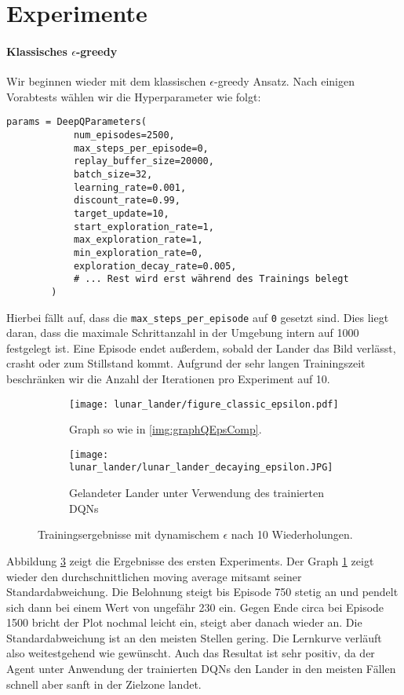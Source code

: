 \section{Experimente}
\paragraph{Klassisches $ \epsilon $-greedy}
Wir beginnen wieder mit dem klassischen $ \epsilon $-greedy Ansatz. Nach einigen Vorabtests wählen wir die Hyperparameter wie folgt:
\begin{verbatim}
params = DeepQParameters(
            num_episodes=2500,
            max_steps_per_episode=0,
            replay_buffer_size=20000,
            batch_size=32,
            learning_rate=0.001,
            discount_rate=0.99,
            target_update=10,
            start_exploration_rate=1,
            max_exploration_rate=1,
            min_exploration_rate=0,
            exploration_decay_rate=0.005,
            # ... Rest wird erst während des Trainings belegt
        )
\end{verbatim}
Hierbei fällt auf, dass die \texttt{max_steps_per_episode} auf \texttt{0} gesetzt sind. Dies liegt daran, dass die maximale Schrittanzahl in der Umgebung intern auf 1000 festgelegt ist. Eine Episode endet außerdem, sobald der Lander das Bild verlässt, crasht oder zum Stillstand kommt. Aufgrund der sehr langen Trainingszeit beschränken wir die Anzahl der Iterationen pro Experiment auf 10.

\begin{figure}[h!]
    \centering
    \begin{subfigure}[b]{0.7\textwidth}
        \texttt{[image: lunar\_lander/figure\_classic\_epsilon.pdf]}
        \caption{Graph so wie in \ref{img:graphQEpsComp}.}
        \label{img:lunarClassicEps01Graph}
    \end{subfigure}
    \begin{subfigure}[b]{0.5\textwidth}
        \texttt{[image: lunar\_lander/lunar\_lander\_decaying\_epsilon.JPG]}
        \caption{Gelandeter Lander unter Verwendung des trainierten DQNs}
        \label{img:lunarClassicEps01Env}
    \end{subfigure}
    \caption{Trainingsergebnisse mit dynamischem $ \epsilon $ nach 10 Wiederholungen.} \label{img:lunarClassicEps01}
\end{figure}

Abbildung \ref{img:lunarClassicEps01} zeigt die Ergebnisse des ersten Experiments. Der Graph \ref{img:lunarClassicEps01Graph} zeigt wieder den durchschnittlichen moving average mitsamt seiner Standardabweichung. Die Belohnung steigt bis Episode 750 stetig an und pendelt sich dann bei einem Wert von ungefähr 230 ein. Gegen Ende circa bei Episode 1500 bricht der Plot nochmal leicht ein, steigt aber danach wieder an. Die Standardabweichung ist an den meisten Stellen gering. Die Lernkurve verläuft also weitestgehend wie gewünscht. Auch das Resultat ist sehr positiv, da der Agent unter Anwendung der trainierten DQNs den Lander in den meisten Fällen schnell aber sanft in der Zielzone landet.

